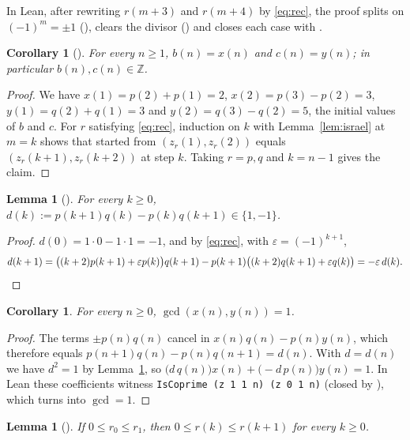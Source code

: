 \documentclass[11pt]{amsart}
\theoremstyle{plain}
\newtheorem{lemma}[theorem]{Lemma}
\newtheorem{corollary}[theorem]{Corollary}
\theoremstyle{definition}
\newcommand{\Z}{\mathbb{Z}}
\begin{document}
In Lean, after rewriting $r(m+3)$ and $r(m+4)$ by \eqref{eq:rec}, the proof splits on $(-1)^m=\pm1$ (), clears the divisor () and closes each case with .

\begin{corollary}[]\label{cor:bc}
For every $n\ge1$, $b(n)=x(n)$ and $c(n)=y(n)$; in particular $b(n),c(n)\in\Z$.
\end{corollary}

\begin{proof}
We have $x(1)=p(2)+p(1)=2$, $x(2)=p(3)-p(2)=3$, $y(1)=q(2)+q(1)=3$ and $y(2)=q(3)-q(2)=5$, the initial values of $b$ and $c$.
For $r$ satisfying \eqref{eq:rec}, induction on $k$ with Lemma~\ref{lem:israel} at $m=k$ shows that  started from $(z_r(1),z_r(2))$ equals $(z_r(k+1),z_r(k+2))$ at step $k$. Taking $r=p,q$ and $k=n-1$ gives the claim.
\end{proof}

\begin{lemma}[]\label{lem:det}
For every $k\ge0$, $d(k):=p(k+1)q(k)-p(k)q(k+1)\in\{1,-1\}$.
\end{lemma}

\begin{proof}
$d(0)=1\cdot0-1\cdot1=-1$, and by \eqref{eq:rec}, with $\varepsilon=(-1)^{k+1}$,
\[
  d(k+1)=\bigl((k+2)p(k+1)+\varepsilon p(k)\bigr)q(k+1)-p(k+1)\bigl((k+2)q(k+1)+\varepsilon q(k)\bigr)
  =-\varepsilon\,d(k). \qedhere
\]
\end{proof}

\begin{corollary}\label{cor:coprime}
For every $n\ge0$, $\gcd(x(n),y(n))=1$.
\end{corollary}

\begin{proof}
The terms $\pm p(n)q(n)$ cancel in $x(n)q(n)-p(n)y(n)$, which therefore equals $p(n+1)q(n)-p(n)q(n+1)=d(n)$.
With $d=d(n)$ we have $d^2=1$ by Lemma~\ref{lem:det}, so $\bigl(d\,q(n)\bigr)x(n)+\bigl(-d\,p(n)\bigr)y(n)=1$. In Lean these coefficients witness \texttt{IsCoprime (z 1 1 n) (z 0 1 n)} (closed by ), which  turns into $\gcd=1$.
\end{proof}

\begin{lemma}[]\label{lem:mono}
If $0\le r_0\le r_1$, then $0\le r(k)\le r(k+1)$ for every $k\ge0$.
\end{lemma}
\end{document}
